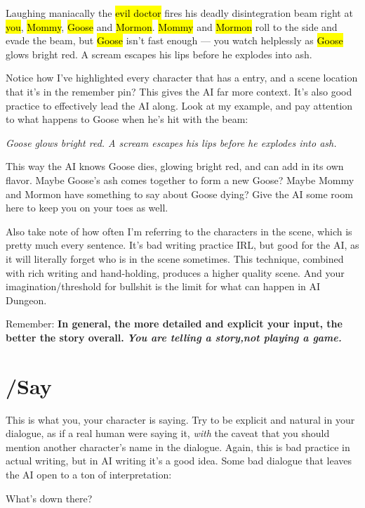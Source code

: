 \documentclass[Avsfag-main.tex]{subfiles}
\begin{document}
\begin{storyb}
	\story Laughing maniacally the \hl{evil doctor} fires his deadly disintegration beam right at \hl{you}, \hl{Mommy}, \hl{Goose} and \hl{Mormon}.
	\hl{Mommy} and \hl{Mormon} roll to the side and evade the beam, but \hl{Goose} isn't fast enough — you watch helplessly as \hl{Goose} glows bright red.
	A scream escapes his lips before he explodes into ash.
\end{storyb}

Notice how I've highlighted every character that has a \wi entry, and a scene location that it's in the remember pin?
This gives the AI far more context.
It's also good practice to effectively lead the AI along.
Look at my \story example, and pay attention to what happens to Goose when he's hit with the beam:

\emph{Goose glows bright red. A scream escapes his lips before he explodes into ash.}

This way the AI knows Goose dies, glowing bright red, and can add in its own flavor.
Maybe Goose's ash comes together to form a new Goose?
Maybe Mommy and Mormon have something to say about Goose dying?
Give the AI some room here to keep you on your toes as well.

Also take note of how often I'm referring to the characters in the scene, which is pretty much every sentence.
It's bad writing practice IRL, but good for the AI, as it will literally forget who is in the scene sometimes.
This technique, combined with rich writing and hand-holding, produces a higher quality scene. 
And your imagination/threshold for bullshit is the limit for what can happen in AI Dungeon.

Remember: \textbf{In general, the more detailed and explicit your input, the better the story overall.}
\emph{\textbf{You are telling a story,not playing a game.}}

\section{/Say}

This is what you, your character is saying.
Try to be explicit and natural in your dialogue, as if a real human were saying it, \emph{with} the caveat that you should mention another character's name in the dialogue.
Again, this is bad practice in actual writing, but in AI writing it's a good idea.
Some bad dialogue that leaves the AI open to a ton of interpretation:

\begin{storyb}
	\say What's down there?
\end{storyb}
\end{document}

